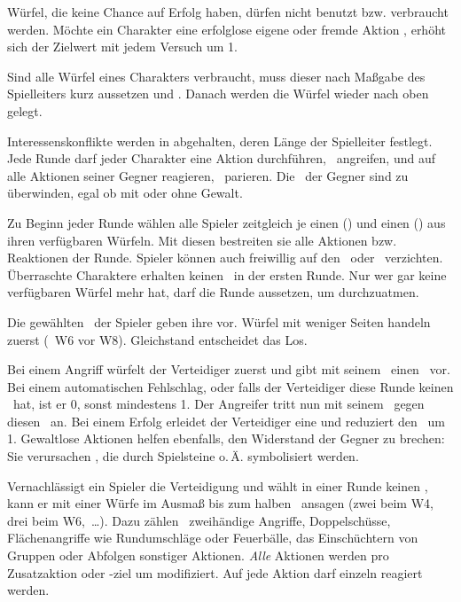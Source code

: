 {		Würfel, die keine Chance auf Erfolg haben, dürfen nicht benutzt bzw. verbraucht werden. Möchte ein Charakter eine erfolglose eigene oder fremde Aktion , erhöht sich der Zielwert mit jedem Versuch um 1.

		Sind alle Würfel eines Charakters verbraucht, muss dieser nach Maßgabe des Spielleiters kurz aussetzen und . Danach werden die Würfel wieder nach oben gelegt.


		\noindent
		Interessenskonflikte werden in  abgehalten, deren Länge der Spielleiter festlegt. Jede Runde darf jeder Charakter eine Aktion durchführen, \zB\ angreifen, und auf alle Aktionen seiner Gegner reagieren, \zB\ parieren. Die \HD\ der Gegner sind zu überwinden, egal ob mit oder ohne Gewalt.

		Zu Beginn jeder Runde wählen alle Spieler zeitgleich je einen  (\AD) und einen  (\RD) aus ihren verfügbaren Würfeln. Mit diesen bestreiten sie alle Aktionen bzw. Reaktionen der Runde. Spieler können auch freiwillig auf den \AD\ oder \RD\ verzichten. Überraschte Charaktere erhalten keinen \AD\ in der ersten Runde. Nur wer gar keine verfügbaren Würfel mehr hat, darf die Runde aussetzen, um durchzuatmen.

		Die gewählten \AD\ der Spieler geben ihre  vor. Würfel mit weniger Seiten handeln zuerst (\zB\ W6 vor W8). Gleichstand entscheidet das Los.

		Bei einem Angriff würfelt der Verteidiger zuerst und gibt mit seinem \RD\ einen \TN\ vor. Bei einem automatischen Fehlschlag, oder falls der Verteidiger diese Runde keinen \RD\ hat, ist er 0, sonst mindestens 1. Der Angreifer tritt nun mit seinem \AD\ gegen diesen \TN\ an. Bei einem Erfolg erleidet der Verteidiger eine  und reduziert den \HD\ um 1. Gewaltlose Aktionen helfen ebenfalls, den Widerstand der Gegner zu brechen: Sie verursachen , die durch Spielsteine o.\,Ä. symbolisiert werden.

		Vernachlässigt ein Spieler die Verteidigung und wählt in einer Runde keinen \RD, kann er mit einer  Würfe im Ausmaß bis zum halben \AD\ ansagen (zwei beim W4, drei beim W6,~\ldots). Dazu zählen \zB\ zweihändige Angriffe, Doppelschüsse, Flächenangriffe wie Rundumschläge oder Feuerbälle, das Einschüchtern von Gruppen oder Abfolgen sonstiger Aktionen. \emph{Alle} Aktionen werden pro Zusatzaktion oder -ziel um  modifiziert. Auf jede Aktion darf einzeln reagiert werden.

}

